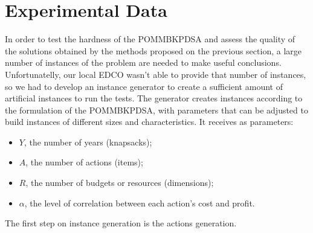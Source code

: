 \section{Experimental Data}
\label{sec:exp_data}

In order to test the hardness of the POMMBKPDSA and assess the quality of the solutions obtained by the methods 
proposed on the previous section, a large number of instances of the problem are needed to make useful 
conclusions. Unfortunatelly, our local EDCO wasn't able to provide that number of instances, so we had 
to develop an instance generator to create a sufficient amount of artificial instances to run the tests. 
The generator creates instances according to the formulation of the POMMBKPDSA, with parameters that can be 
adjusted to build instances of different sizes and characteristics. It receives as parameters:
\begin{itemize}
  \item $Y$, the number of years (knapsacks);
  \item $A$, the number of actions (items);
  \item $R$, the number of budgets or resources (dimensions);
  \item $\alpha$, the level of correlation between each action's cost and profit.
\end{itemize}

The first step on instance generation is the actions generation.




